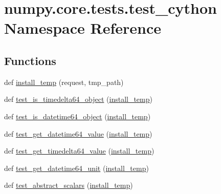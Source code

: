 \hypertarget{namespacenumpy_1_1core_1_1tests_1_1test__cython}{}\section{numpy.\+core.\+tests.\+test\+\_\+cython Namespace Reference}
\label{namespacenumpy_1_1core_1_1tests_1_1test__cython}
\subsection*{Functions}
\begin{DoxyCompactItemize}
\item 
def \hyperlink{namespacenumpy_1_1core_1_1tests_1_1test__cython_a399872925418565eb54fefb7463e2b22}{install\+\_\+temp} (request, tmp\+\_\+path)
\item 
def \hyperlink{namespacenumpy_1_1core_1_1tests_1_1test__cython_a4d4582f9d3e9847cf99069dc290e7295}{test\+\_\+is\+\_\+timedelta64\+\_\+object} (\hyperlink{namespacenumpy_1_1core_1_1tests_1_1test__cython_a399872925418565eb54fefb7463e2b22}{install\+\_\+temp})
\item 
def \hyperlink{namespacenumpy_1_1core_1_1tests_1_1test__cython_a5c6f1dd7a3377e39cf0ef9656ad5f2be}{test\+\_\+is\+\_\+datetime64\+\_\+object} (\hyperlink{namespacenumpy_1_1core_1_1tests_1_1test__cython_a399872925418565eb54fefb7463e2b22}{install\+\_\+temp})
\item 
def \hyperlink{namespacenumpy_1_1core_1_1tests_1_1test__cython_a49e3d8f8b8e0911e02e19e16b560f979}{test\+\_\+get\+\_\+datetime64\+\_\+value} (\hyperlink{namespacenumpy_1_1core_1_1tests_1_1test__cython_a399872925418565eb54fefb7463e2b22}{install\+\_\+temp})
\item 
def \hyperlink{namespacenumpy_1_1core_1_1tests_1_1test__cython_a06ad2bc994b7377134e128d78f5f9ce9}{test\+\_\+get\+\_\+timedelta64\+\_\+value} (\hyperlink{namespacenumpy_1_1core_1_1tests_1_1test__cython_a399872925418565eb54fefb7463e2b22}{install\+\_\+temp})
\item 
def \hyperlink{namespacenumpy_1_1core_1_1tests_1_1test__cython_aab41f80729234c36d440286d30498309}{test\+\_\+get\+\_\+datetime64\+\_\+unit} (\hyperlink{namespacenumpy_1_1core_1_1tests_1_1test__cython_a399872925418565eb54fefb7463e2b22}{install\+\_\+temp})
\item 
def \hyperlink{namespacenumpy_1_1core_1_1tests_1_1test__cython_a30dd6b902ae9532b133308feb6c38aec}{test\+\_\+abstract\+\_\+scalars} (\hyperlink{namespacenumpy_1_1core_1_1tests_1_1test__cython_a399872925418565eb54fefb7463e2b22}{install\+\_\+temp})
\end{DoxyCompactItemize}
